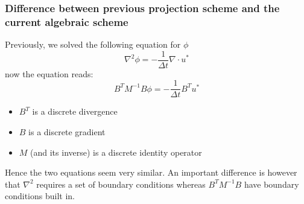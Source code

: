 \begin{frame}
\frametitle{Difference between previous projection scheme and 
the current algebraic scheme}

Previously, we solved 
the following equation for $\phi$ 
\[
\nabla^2  \phi = - \frac{1}{\Delta t} \nabla \cdot u^* 
\]
now the equation reads:  
\[
B^T M^{-1} B \phi = - \frac{1}{\Delta t} B^T u^* 
\]
\begin{itemize}
\item 
$B^T$ is a discrete divergence 
\item 
$B$ is a discrete gradient
\item 
$M$ (and its inverse) is a discrete identity operator  
\end{itemize}
Hence the two equations seem very similar. 
An important difference is however that $\nabla^2$ requires
a set of boundary conditions whereas  $B^T M^{-1} B$ 
have boundary conditions built in. 

\end{frame}
